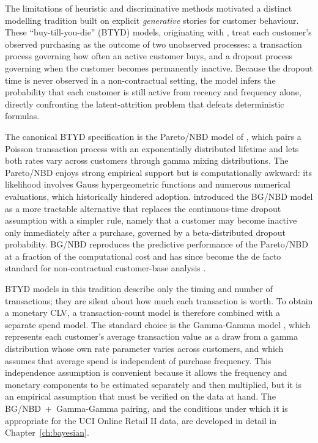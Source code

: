 \documentclass[12pt, a4paper, oneside]{report}
\begin{document}
The limitations of heuristic and discriminative methods motivated a distinct modelling tradition built on explicit \emph{generative} stories for customer behaviour. These ``buy-till-you-die'' (BTYD) models, originating with \textcite{schmittlein1987}, treat each customer's observed purchasing as the outcome of two unobserved processes: a transaction process governing how often an active customer buys, and a dropout process governing when the customer becomes permanently inactive. Because the dropout time is never observed in a non-contractual setting, the model infers the probability that each customer is still active from recency and frequency alone, directly confronting the latent-attrition problem that defeats deterministic formulas.

The canonical BTYD specification is the Pareto/NBD model of \textcite{schmittlein1987}, which pairs a Poisson transaction process with an exponentially distributed lifetime and lets both rates vary across customers through gamma mixing distributions. The Pareto/NBD enjoys strong empirical support but is computationally awkward: its likelihood involves Gauss hypergeometric functions and numerous numerical evaluations, which historically hindered adoption. \textcite{fader2005} introduced the BG/NBD model as a more tractable alternative that replaces the continuous-time dropout assumption with a simpler rule, namely that a customer may become inactive only immediately after a purchase, governed by a beta-distributed dropout probability. BG/NBD reproduces the predictive performance of the Pareto/NBD at a fraction of the computational cost and has since become the de facto standard for non-contractual customer-base analysis \parencite{fader2009}.

BTYD models in this tradition describe only the timing and number of transactions; they are silent about how much each transaction is worth. To obtain a monetary CLV, a transaction-count model is therefore combined with a separate spend model. The standard choice is the Gamma-Gamma model \parencite{fader2013}, which represents each customer's average transaction value as a draw from a gamma distribution whose own rate parameter varies across customers, and which assumes that average spend is independent of purchase frequency. This independence assumption is convenient because it allows the frequency and monetary components to be estimated separately and then multiplied, but it is an empirical assumption that must be verified on the data at hand. The BG/NBD~$+$~Gamma-Gamma pairing, and the conditions under which it is appropriate for the UCI Online Retail II data, are developed in detail in Chapter~\ref{ch:bayesian}.
\end{document}
